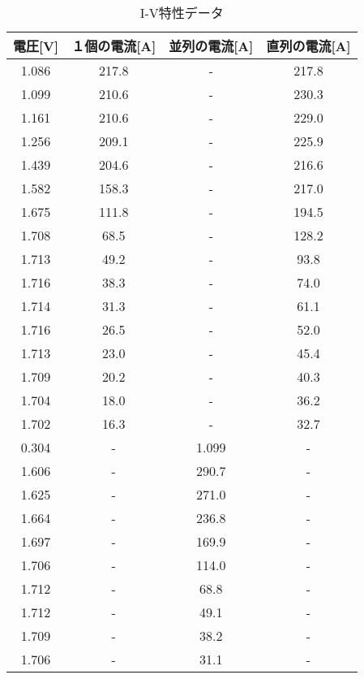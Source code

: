 \documentclass[a4paper,11pt,xelatex,ja=standard]{bxjsarticle}
\begin{document}
            \begin{table}[H]
                \centering
                \caption{I-V特性データ}
                \begin{tabular}{|c|c|c|c|}
                    \hline
                    電圧[V] & １個の電流[A] & 並列の電流[A] & 直列の電流[A] \\
                    \hline
                    1.086 & 217.8 & - & 217.8 \\
                    1.099 & 210.6 & - & 230.3 \\
                    1.161 & 210.6 & - & 229.0 \\
                    1.256 & 209.1 & - & 225.9 \\
                    1.439 & 204.6 & - & 216.6 \\
                    1.582 & 158.3 & - & 217.0 \\
                    1.675 & 111.8 & - & 194.5 \\
                    1.708 & 68.5 & - & 128.2 \\
                    1.713 & 49.2 & - & 93.8 \\
                    1.716 & 38.3 & - & 74.0 \\
                    1.714 & 31.3 & - & 61.1 \\
                    1.716 & 26.5 & - & 52.0 \\
                    1.713 & 23.0 & - & 45.4 \\
                    1.709 & 20.2 & - & 40.3 \\
                    1.704 & 18.0 & - & 36.2 \\
                    1.702 & 16.3 & - & 32.7 \\
                    0.304 & - & 1.099 & - \\
                    1.606 & - & 290.7 & - \\
                    1.625 & - & 271.0 & - \\
                    1.664 & - & 236.8 & - \\
                    1.697 & - & 169.9 & - \\
                    1.706 & - & 114.0 & - \\
                    1.712 & - & 68.8 & - \\
                    1.712 & - & 49.1 & - \\
                    1.709 & - & 38.2 & - \\
                    1.706 & - & 31.1 & - \\

\end{tabular}
\end{table}
\end{document}
